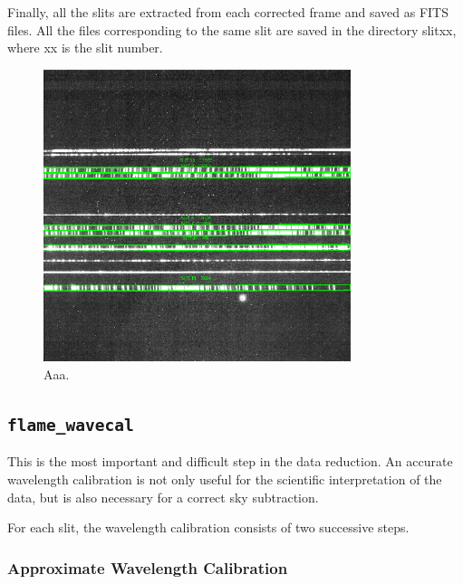 \documentclass[a4paper, notitlepage]{article}
\begin{document}
Finally, all the slits are extracted from each corrected frame and saved as FITS files. All the files corresponding to the same slit are saved in the directory slitxx, where xx is the slit number.

\begin{figure}[htbp]
\centering
\includegraphics[width=0.8\textwidth]{slits}
\caption{Aaa.}
\label{fig:slits}
\end{figure}



\subsection{\texttt{flame\_wavecal}}

This is the most important and difficult step in the data reduction. An accurate wavelength calibration is not only useful for the scientific interpretation of the data, but is also necessary for a correct sky subtraction. 

For each slit, the wavelength calibration consists of two successive steps.


\subsubsection{Approximate Wavelength Calibration}
\end{document}
